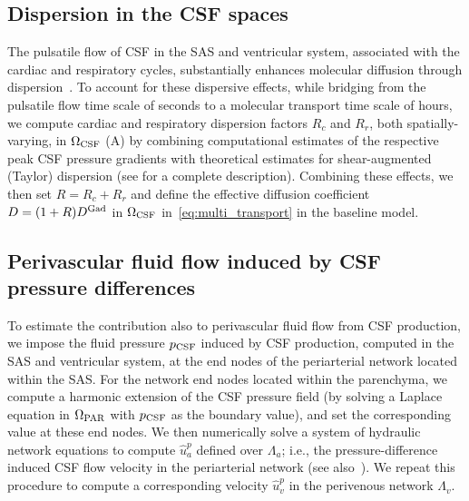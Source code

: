 \documentclass[fleqn,10pt]{wlscirep}
\begin{document}
\subsection*{Dispersion in the CSF spaces}

The pulsatile flow of CSF in the SAS and ventricular system,
associated with the cardiac and respiratory cycles, substantially
enhances molecular diffusion through
dispersion~\cite{taylor1953dispersion, watson1983diffusion,
  asgari2016glymphatic, keith2019dispersion, ray2021quantitative,
  troyetsky2021dispersion}. To account for these dispersive effects,
while bridging from the pulsatile flow time scale of seconds to a
molecular transport time scale of hours, we compute cardiac and
respiratory dispersion factors $R_c$ and $R_r$, both
spatially-varying, in $\Omega_{\rm CSF}$ (A) by
combining computational estimates of the respective peak CSF pressure
gradients with theoretical estimates for shear-augmented (Taylor)
dispersion \cite{taylor1953dispersion, watson1983diffusion,
  keith2019dispersion} (see  for a complete
description). Combining these effects, we then set $R = R_c + R_r$ and
define the effective diffusion coefficient $D = (1 + R) D^{\rm Gad}$
in $\Omega_{\rm CSF}$ in~\eqref{eq:multi_transport} in the baseline model.

\subsection*{Perivascular fluid flow induced by CSF pressure differences}

To estimate the contribution also to perivascular fluid flow from CSF
production, we impose the fluid pressure $p_{\rm CSF}$ induced by CSF
production, computed in the SAS and ventricular system, at the end
nodes of the periarterial network located within the SAS. For the
network end nodes located within the parenchyma, we compute a harmonic
extension of the CSF pressure field (by solving a Laplace equation in
$\Omega_{\rm PAR}$ with $p_{\rm CSF}$ as the boundary value), and set
the corresponding value at these end nodes. We then numerically solve
a system of hydraulic network equations to compute $\hat{u}^p_a$
defined over $\Lambda_a$; i.e., the pressure-difference induced CSF
flow velocity in the periarterial network (see
also~). We repeat this procedure to
compute a corresponding velocity $\hat{u}^p_v$ in the perivenous
network $\Lambda_v$.
\end{document}
